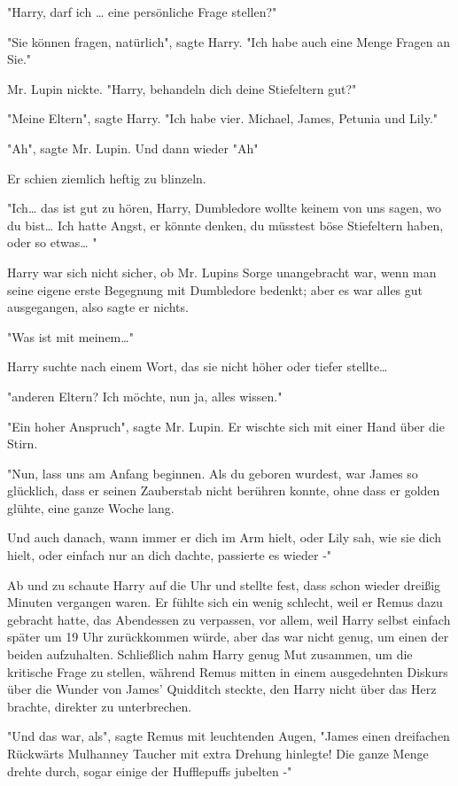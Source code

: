 {"Harry, darf ich … eine persönliche Frage stellen?"

"Sie können fragen, natürlich", sagte Harry. "Ich habe auch eine Menge Fragen an Sie."

Mr. Lupin nickte. "Harry, behandeln dich deine Stiefeltern gut?"

"Meine Eltern", sagte Harry. "Ich habe vier. Michael, James, Petunia und Lily."

"Ah", sagte Mr. Lupin. Und dann wieder "Ah"

Er schien ziemlich heftig zu blinzeln.

"Ich… das ist gut zu hören, Harry, Dumbledore wollte keinem von uns sagen, wo du bist… Ich hatte Angst, er könnte denken, du müsstest böse Stiefeltern haben, oder so etwas… "

Harry war sich nicht sicher, ob Mr. Lupins Sorge unangebracht war, wenn man seine eigene erste Begegnung mit Dumbledore bedenkt; aber es war alles gut ausgegangen, also sagte er nichts.

"Was ist mit meinem…"

Harry suchte nach einem Wort, das sie nicht höher oder tiefer stellte…

"anderen Eltern? Ich möchte, nun ja, alles wissen."

"Ein hoher Anspruch", sagte Mr. Lupin. Er wischte sich mit einer Hand über die Stirn.

"Nun, lass uns am Anfang beginnen. Als du geboren wurdest, war James so glücklich, dass er seinen Zauberstab nicht berühren konnte, ohne dass er golden glühte, eine ganze Woche lang.

Und auch danach, wann immer er dich im Arm hielt, oder Lily sah, wie sie dich hielt, oder einfach nur an dich dachte, passierte es wieder -"

Ab und zu schaute Harry auf die Uhr und stellte fest, dass schon wieder dreißig Minuten vergangen waren. Er fühlte sich ein wenig schlecht, weil er Remus dazu gebracht hatte, das Abendessen zu verpassen, vor allem, weil Harry selbst einfach später um 19 Uhr zurückkommen würde, aber das war nicht genug, um einen der beiden aufzuhalten. Schließlich nahm Harry genug Mut zusammen, um die kritische Frage zu stellen, während Remus mitten in einem ausgedehnten Diskurs über die Wunder von James' Quidditch steckte, den Harry nicht über das Herz brachte, direkter zu unterbrechen.

"Und das war, als", sagte Remus mit leuchtenden Augen, "James einen dreifachen Rückwärts Mulhanney Taucher mit extra Drehung hinlegte! Die ganze Menge drehte durch, sogar einige der Hufflepuffs jubelten -"

}
